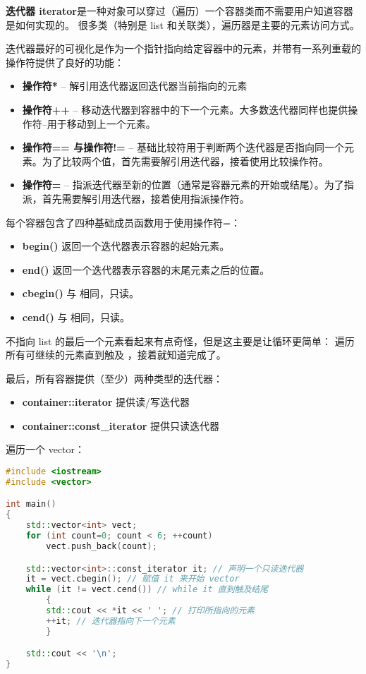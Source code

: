 \documentclass[../../LearnCpp.tex]{subfiles}
\begin{document}

\textbf{迭代器 iterator}是一种对象可以穿过（遍历）一个容器类而不需要用户知道容器是如何实现的。
很多类（特别是 list 和关联类），遍历器是主要的元素访问方式。

迭代器最好的可视化是作为一个指针指向给定容器中的元素，并带有一系列重载的操作符提供了良好的功能：

\begin{itemize}
    \item \textbf{操作符*} -- 解引用迭代器返回迭代器当前指向的元素
    \item \textbf{操作符++} -- 移动迭代器到容器中的下一个元素。大多数迭代器同样也提供操作符--用于移动到上一个元素。
    \item \textbf{操作符== 与操作符!=} -- 基础比较符用于判断两个迭代器是否指向同一个元素。为了比较两个值，首先需要解引用迭代器，接着使用比较操作符。
    \item \textbf{操作符=} -- 指派迭代器至新的位置（通常是容器元素的开始或结尾）。为了指派，首先需要解引用迭代器，接着使用指派操作符。
\end{itemize}

每个容器包含了四种基础成员函数用于使用操作符=：

\begin{itemize}
    \item \textbf{begin()} 返回一个迭代器表示容器的起始元素。
    \item \textbf{end()} 返回一个迭代器表示容器的末尾元素之后的位置。
    \item \textbf{cbegin()} 与  相同，只读。
    \item \textbf{cend()} 与  相同，只读。
\end{itemize}

 不指向 list 的最后一个元素看起来有点奇怪，但是这主要是让循环更简单：
遍历所有可继续的元素直到触及 ，接着就知道完成了。

最后，所有容器提供（至少）两种类型的迭代器：

\begin{itemize}
    \item \textbf{container::iterator} 提供读/写迭代器
    \item \textbf{container::const\_iterator} 提供只读迭代器
\end{itemize}

遍历一个 vector：

\begin{lstlisting}[language=C++]
#include <iostream>
#include <vector>

int main()
{
    std::vector<int> vect;
    for (int count=0; count < 6; ++count)
        vect.push_back(count);

    std::vector<int>::const_iterator it; // 声明一个只读迭代器
    it = vect.cbegin(); // 赋值 it 来开始 vector
    while (it != vect.cend()) // while it 直到触及结尾
        {
        std::cout << *it << ' '; // 打印所指向的元素
        ++it; // 迭代器指向下一个元素
        }

    std::cout << '\n';
}
\end{lstlisting}
\end{document}
